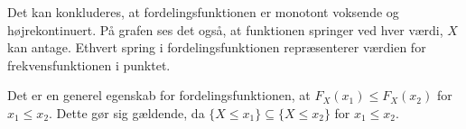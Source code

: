 \begin{eks}

Det kan konkluderes, at fordelingsfunktionen er monotont voksende og højrekontinuert. På grafen ses det også, at funktionen springer ved hver værdi, $X$ kan antage. Ethvert spring i fordelingsfunktionen repræsenterer værdien for frekvensfunktionen i punktet. 
\end{eks}

Det er en generel egenskab for fordelingsfunktionen, at $F_X(x_1)\leq F_X(x_2)$ for $x_1\leq x_2$. Dette gør sig gældende, da $\{X\leq x_1\}\subseteq \{X\leq x_2\}$ for $x_1\leq x_2$.




